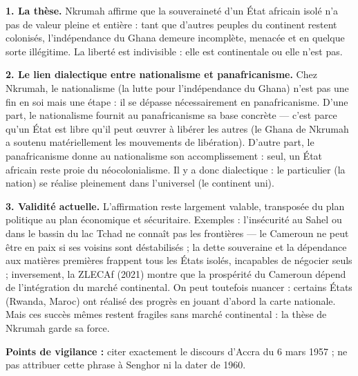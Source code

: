 \documentclass[11pt]{article}
\begin{document}
\begin{corrige}

\textbf{1. La thèse.} Nkrumah affirme que la souveraineté d'un État africain isolé n'a pas de valeur pleine et entière : tant que d'autres peuples du continent restent colonisés, l'indépendance du Ghana demeure incomplète, menacée et en quelque sorte illégitime. La liberté est indivisible : elle est continentale ou elle n'est pas.

\textbf{2. Le lien dialectique entre nationalisme et panafricanisme.} Chez Nkrumah, le nationalisme (la lutte pour l'indépendance du Ghana) n'est pas une fin en soi mais une étape : il se dépasse nécessairement en panafricanisme. D'une part, le nationalisme fournit au panafricanisme sa base concrète — c'est parce qu'un État est libre qu'il peut œuvrer à libérer les autres (le Ghana de Nkrumah a soutenu matériellement les mouvements de libération). D'autre part, le panafricanisme donne au nationalisme son accomplissement : seul, un État africain reste proie du néocolonialisme. Il y a donc dialectique : le particulier (la nation) se réalise pleinement dans l'universel (le continent uni).

\textbf{3. Validité actuelle.} L'affirmation reste largement valable, transposée du plan politique au plan économique et sécuritaire. Exemples : l'insécurité au Sahel ou dans le bassin du lac Tchad ne connaît pas les frontières — le Cameroun ne peut être en paix si ses voisins sont déstabilisés ; la dette souveraine et la dépendance aux matières premières frappent tous les États isolés, incapables de négocier seuls ; inversement, la ZLECAf (2021) montre que la prospérité du Cameroun dépend de l'intégration du marché continental. On peut toutefois nuancer : certains États (Rwanda, Maroc) ont réalisé des progrès en jouant d'abord la carte nationale. Mais ces succès mêmes restent fragiles sans marché continental : la thèse de Nkrumah garde sa force.

\textbf{Points de vigilance :} citer exactement le discours d'Accra du 6 mars 1957 ; ne pas attribuer cette phrase à Senghor ni la dater de 1960.
\end{corrige}
\end{document}
